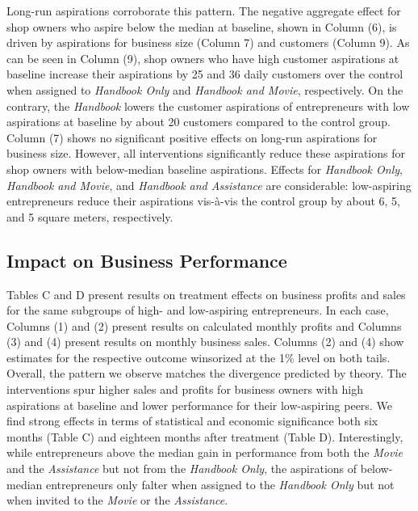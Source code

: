 \documentclass[11.5pt]{article}
\begin{document}
Long-run aspirations corroborate this pattern. The negative aggregate effect for shop owners who aspire below the median at baseline, shown in Column (6), is driven by aspirations for business size (Column 7) and customers (Column 9). As can be seen in Column (9), shop owners who have high customer aspirations at baseline increase their aspirations by 25 and 36 daily customers over the control when assigned to \emph{Handbook Only} and \emph{Handbook and Movie}, respectively. On the contrary, the \emph{Handbook} lowers the customer aspirations of entrepreneurs with low aspirations at baseline by about 20 customers compared to the control group. Column (7) shows no significant positive effects on long-run aspirations for business size. However, all interventions significantly reduce these aspirations for shop owners with below-median baseline aspirations. Effects for \emph{Handbook Only}, \emph{Handbook and Movie}, and \emph{Handbook and Assistance} are considerable: low-aspiring entrepreneurs reduce their aspirations vis-\`{a}-vis the control group by about 6, 5, and 5 square meters, respectively.


\subsection{Impact on Business Performance}

Tables C and D present results on treatment effects on business profits and sales for the same subgroups of high- and low-aspiring entrepreneurs. In each case, Columns (1) and (2) present results on calculated monthly profits and Columns (3) and (4) present results on monthly business sales. Columns (2) and (4) show estimates for the respective outcome winsorized at the 1\% level on both tails. Overall, the pattern we observe matches the divergence predicted by theory. The interventions spur higher sales and profits for business owners with high aspirations at baseline and lower performance for their low-aspiring peers. We find strong effects in terms of statistical and economic significance both six months (Table C) and eighteen months after treatment (Table D). Interestingly, while entrepreneurs above the median gain in performance from both the \emph{Movie} and the \emph{Assistance} but not from the \emph{Handbook Only}, the aspirations of below-median entrepreneurs only falter when assigned to the \emph{Handbook Only} but not when invited to the \emph{Movie} or the \emph{Assistance}.
\end{document}
